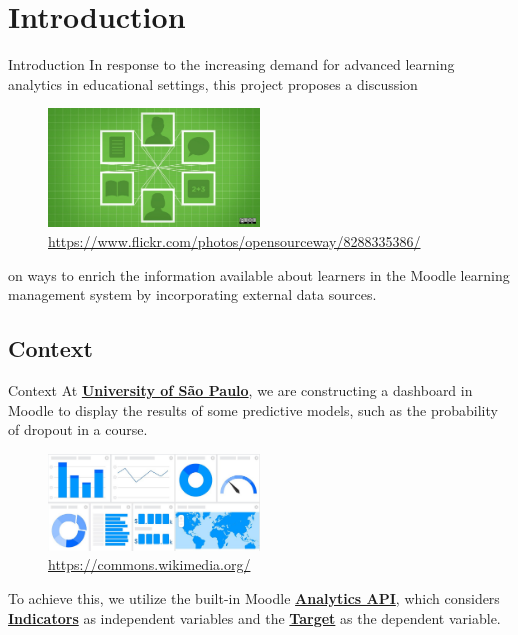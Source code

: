 \section{Introduction}

\begin{frame}{Introduction}
    In response to the increasing demand for advanced learning analytics in educational settings, 
    this project proposes a discussion

    \begin{figure}[H]
        \centering
        \includegraphics[width=0.5\textwidth]{../../images/digital_learning.jpg}
        \\ \small \url{https://www.flickr.com/photos/opensourceway/8288335386/}
    \end{figure}

    on ways to enrich the information available about learners 
    in the Moodle learning management system by incorporating external data sources.
    \cite{park2015development}
\end{frame}

\subsection{Context}
\begin{frame}{Context}
    At \underline{\textbf{University of São Paulo}}, we are constructing a dashboard in Moodle to 
    display the results of some predictive models, such as the probability of dropout in a course. 
   
    \begin{figure}[H]
        \centering
        \includegraphics[width=0.5\textwidth]{../../images/dashboard.jpg}
        \\ \small \url{https://commons.wikimedia.org/}

    \end{figure}

    To achieve this, we utilize the built-in Moodle \underline{\textbf{Analytics API}}, 
    which considers \underline{\textbf{Indicators}} as independent variables and the 
    \underline{\textbf{Target}} as the dependent variable.

\end{frame}

